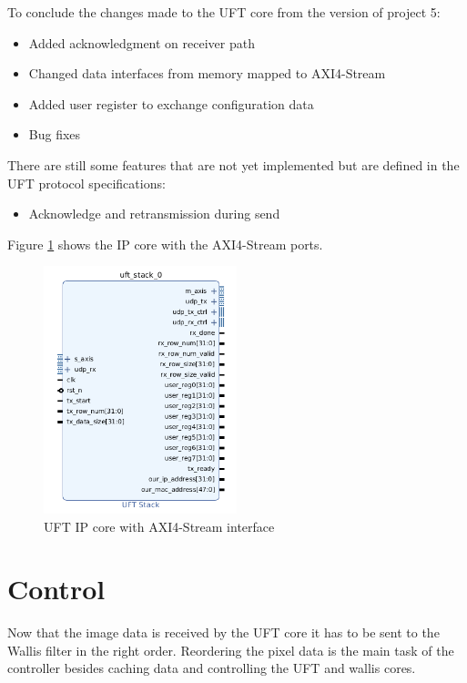 To conclude the changes made to the UFT core from the version of project 5:
\begin{itemize}
  \item Added acknowledgment on receiver path
  \item Changed data interfaces from memory mapped to AXI4-Stream
  \item Added user register to exchange configuration data
  \item Bug fixes
\end{itemize}

There are still some features that are not yet implemented but are defined in
the UFT protocol specifications:
\begin{itemize}
  \item Acknowledge and retransmission during send
\end{itemize}

Figure \ref{fig:uftipcoreaxistream} shows the IP core with the AXI4-Stream
ports.

\begin{figure}[b!]
    \centering
    \includegraphics[width=0.5\textwidth] {images/dataflow/uftcorestream.png}
    \caption{UFT IP core with AXI4-Stream interface}
    \label{fig:uftipcoreaxistream}
\end{figure}
\section{Control} \label{ch:control}
Now that the image data is received by the UFT core it has to be sent to the
Wallis filter in the right order. Reordering the pixel data is the main task of
the controller besides caching data and controlling the UFT and wallis cores. 

